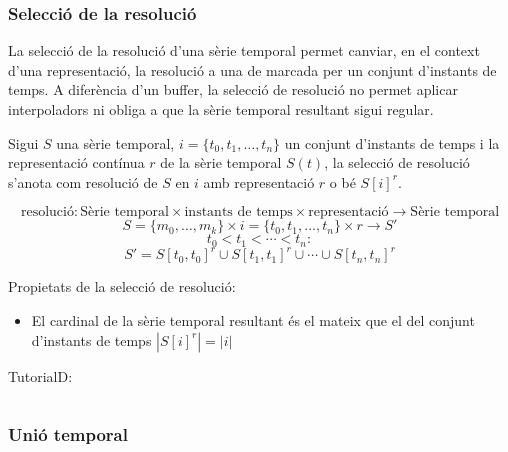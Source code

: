 \subsubsection{Selecció de la resolució}

La selecció de la resolució d'una sèrie temporal permet canviar, en el
context d'una representació, la resolució a una de marcada per un
conjunt d'instants de temps. A diferència d'un buffer, la selecció de
resolució no permet aplicar interpoladors ni obliga a que la sèrie
temporal resultant sigui regular.

Sigui $S$ una sèrie temporal, $i= \{t_0,t_1,\dotsc,t_n\}$ un conjunt
d'instants de temps i la representació contínua $r$ de la sèrie
temporal $S(t)$, la selecció de resolució s'anota com resolució de $S$
en $i$ amb representació $r$ o bé $S[i]^r$.

\begin{definition}
  \[
  \text{resolució}: \text{Sèrie temporal} \times \text{instants de
    temps} \times \text{representació} \longrightarrow \text{Sèrie
    temporal}
  \]
  \[
  S = \{m_0 , \ldots , m_k\} \times i = \{t_0,t_1,\dotsc,t_n\} \times r
  \longrightarrow S'
  \]
  \[
  t_0 < t_1 < \dotsb < t_n:
  \]
  \[
  S' = S[t_0,t_0]^r \cup  S[t_1,t_1]^r \cup \dotsb \cup S[t_{n},t_n]^r
  \] 
\end{definition}



Propietats de la selecció de resolució:
\begin{itemize}
\item El cardinal de la sèrie temporal resultant és el mateix que el del conjunt d'instants de temps $|S[i]^r| = |i|$
\end{itemize}



TutorialD:
\begin{verbatim}

\end{verbatim}



\subsubsection{Unió temporal}

